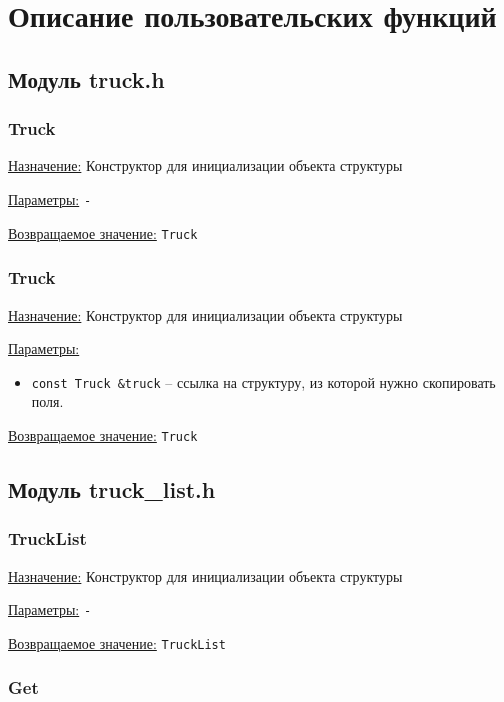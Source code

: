 \section*{Описание пользовательских функций}

\subsection*{Модуль truck.h}

\subsubsection*{Truck}

\underline{Назначение:} Конструктор для инициализации объекта структуры

\underline{Параметры:} \verb|-|

\underline{Возвращаемое значение:} \verb|Truck|


\subsubsection*{Truck}

\underline{Назначение:} Конструктор для инициализации объекта структуры

\underline{Параметры:} 

\begin{itemize}
    \item \verb|const Truck &truck| -- ссылка на структуру, из которой нужно скопировать поля.
\end{itemize}

\underline{Возвращаемое значение:} \verb|Truck|


\subsection*{Модуль truck\_list.h}


\subsubsection*{TruckList}

\underline{Назначение:} Конструктор для инициализации объекта структуры

\underline{Параметры:} \verb|-|

\underline{Возвращаемое значение:} \verb|TruckList|

\subsubsection*{Get}

